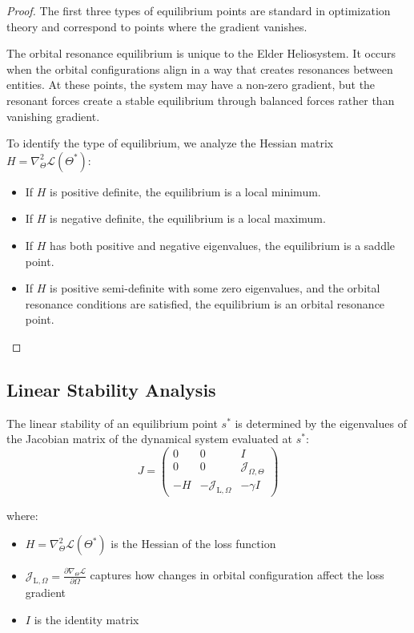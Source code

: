 \begin{proof}
The first three types of equilibrium points are standard in optimization theory and correspond to points where the gradient vanishes.

The orbital resonance equilibrium is unique to the Elder Heliosystem. It occurs when the orbital configurations align in a way that creates resonances between entities. At these points, the system may have a non-zero gradient, but the resonant forces create a stable equilibrium through balanced forces rather than vanishing gradient.

To identify the type of equilibrium, we analyze the Hessian matrix $H = \nabla^2_{\Theta} \mathcal{L}(\Theta^*)$:
\begin{itemize}
    \item If $H$ is positive definite, the equilibrium is a local minimum.
    \item If $H$ is negative definite, the equilibrium is a local maximum.
    \item If $H$ has both positive and negative eigenvalues, the equilibrium is a saddle point.
    \item If $H$ is positive semi-definite with some zero eigenvalues, and the orbital resonance conditions are satisfied, the equilibrium is an orbital resonance point.
\end{itemize}
\end{proof}

\subsection{Linear Stability Analysis}

\begin{theorem}
The linear stability of an equilibrium point $s^*$ is determined by the eigenvalues of the Jacobian matrix of the dynamical system evaluated at $s^*$:
\begin{equation}
J = 
\begin{pmatrix}
0 & 0 & I \\
0 & 0 & \mathcal{J}_{\Omega,\Theta} \\
-H & -\mathcal{J}_{\text{L},\Omega} & -\gamma I
\end{pmatrix}
\end{equation}

where:
\begin{itemize}
    \item $H = \nabla^2_{\Theta} \mathcal{L}(\Theta^*)$ is the Hessian of the loss function
    \item $\mathcal{J}_{\text{L},\Omega} = \frac{\partial \nabla_{\Theta} \mathcal{L}}{\partial \Omega}$ captures how changes in orbital configuration affect the loss gradient
    \item $I$ is the identity matrix
\end{itemize}
\end{theorem}

